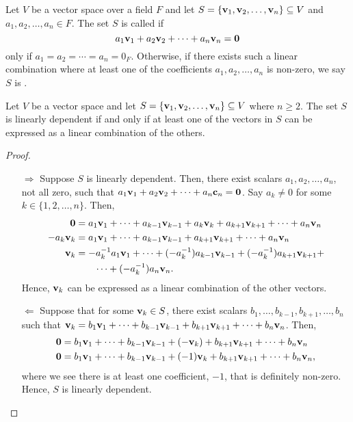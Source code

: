 \begin{defn}
Let $ V $ be a vector space over a field $ F $ and let $ S=\{\mathbf{v}_1,\mathbf{v}_2,\ldots,\mathbf{v}_n\}\subseteq V $ and $ a_1,a_2,\ldots,a_n\in F $. The set $ S $ is called  if
\begin{equation*}
    a_1\mathbf{v}_1+a_2\mathbf{v}_2+\cdots+a_n\mathbf{v}_n=\mathbf{0}
\end{equation*}
only if $ a_1=a_2=\cdots=a_n=0_F $. Otherwise, if there exists such a linear combination where at least one of the coefficients $ a_1,a_2,\ldots,a_n $ is non-zero, we say $ S $ is .
\end{defn}

\begin{thm}
Let $ V $ be a vector space and let $ S=\{\mathbf{v}_1,\mathbf{v}_2,\ldots,\mathbf{v}_n\}\subseteq V $ where $ n\geq 2 $. The set $ S $ is linearly dependent if and only if at least one of the vectors in $ S $ can be expressed as a linear combination of the others.
\end{thm}
\begin{proof}~
\begin{enumerate}
    \item[$ \Rightarrow $] Suppose $ S $ is linearly dependent. Then, there exist scalars $ a_1,a_2,\ldots,a_n $, not all zero, such that $ a_1\mathbf{v}_1+a_2\mathbf{v}_2+\cdots+a_n\mathbf{c}_n=\mathbf{0} $. Say $ a_k\neq 0 $ for some $ k\in\{1,2,\ldots,n\} $. Then,
    \begin{align*}
        \mathbf{0} &= a_1\mathbf{v}_1+\cdots+a_{k-1}\mathbf{v}_{k-1}+a_k\mathbf{v}_k+a_{k+1}\mathbf{v}_{k+1}+\cdots+a_n\mathbf{v}_n \\
        -a_k\mathbf{v}_k &= a_1\mathbf{v}_1+\cdots+a_{k-1}\mathbf{v}_{k-1}+a_{k+1}\mathbf{v}_{k+1}+\cdots+a_n\mathbf{v}_n \\
        \mathbf{v}_k &= -a_k^{-1}a_1\mathbf{v}_1+\cdots+(-a_k^{-1})a_{k-1}\mathbf{v}_{k-1}+(-a_k^{-1})a_{k+1}\mathbf{v}_{k+1}+ \\
        &\qquad \cdots+(-a_k^{-1})a_n\mathbf{v}_n.
    \end{align*}
    Hence, $ \mathbf{v}_k $ can be expressed as a linear combination of the other vectors.

    \item[$ \Leftarrow $] Suppose that for some $ \mathbf{v}_k\in S $, there exist scalars $ b_1,\ldots,b_{k-1},b_{k+1},\ldots,b_n $ such that $ \mathbf{v}_k=b_1\mathbf{v}_1+\cdots+b_{k-1}\mathbf{v}_{k-1}+b_{k+1}\mathbf{v}_{k+1}+\cdots+b_n\mathbf{v}_n $. Then,
    \begin{align*}
        \mathbf{0} &= b_1\mathbf{v}_1+\cdots+b_{k-1}\mathbf{v}_{k-1}+(-\mathbf{v}_k)+b_{k+1}\mathbf{v}_{k+1}+\cdots+b_n\mathbf{v}_n \\
        \mathbf{0} &= b_1\mathbf{v}_1+\cdots+b_{k-1}\mathbf{v}_{k-1}+(-1)\mathbf{v}_k+b_{k+1}\mathbf{v}_{k+1}+\cdots+b_n\mathbf{v}_n,
    \end{align*}
    where we see there is at least one coefficient, $ -1 $, that is definitely non-zero. Hence, $ S $ is linearly dependent.\qedhere
\end{enumerate}
\end{proof}

